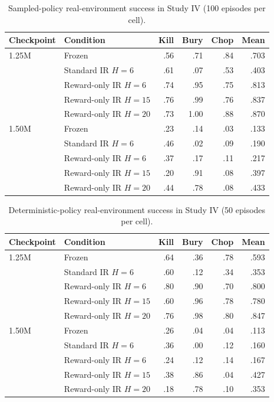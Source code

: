 \documentclass[10pt]{article}
\begin{document}
\begin{table}[H]
\centering
\small
\caption{Sampled-policy real-environment success in Study IV (100 episodes per cell).}
\begin{tabular}{llrrrr}
\toprule
Checkpoint & Condition & Kill & Bury & Chop & Mean \\
\midrule
1.25M & Frozen & .56 & .71 & .84 & .703 \\
      & Standard IR $H=6$ & .61 & .07 & .53 & .403 \\
      & Reward-only IR $H=6$ & .74 & .95 & .75 & .813 \\
      & Reward-only IR $H=15$ & .76 & .99 & .76 & .837 \\
      & Reward-only IR $H=20$ & .73 & 1.00 & .88 & .870 \\
\midrule
1.50M & Frozen & .23 & .14 & .03 & .133 \\
      & Standard IR $H=6$ & .46 & .02 & .09 & .190 \\
      & Reward-only IR $H=6$ & .37 & .17 & .11 & .217 \\
      & Reward-only IR $H=15$ & .20 & .91 & .08 & .397 \\
      & Reward-only IR $H=20$ & .44 & .78 & .08 & .433 \\
\bottomrule
\end{tabular}
\end{table}

\begin{table}[H]
\centering
\small
\caption{Deterministic-policy real-environment success in Study IV (50 episodes per cell).}
\begin{tabular}{llrrrr}
\toprule
Checkpoint & Condition & Kill & Bury & Chop & Mean \\
\midrule
1.25M & Frozen & .64 & .36 & .78 & .593 \\
      & Standard IR $H=6$ & .60 & .12 & .34 & .353 \\
      & Reward-only IR $H=6$ & .80 & .90 & .70 & .800 \\
      & Reward-only IR $H=15$ & .60 & .96 & .78 & .780 \\
      & Reward-only IR $H=20$ & .76 & .98 & .80 & .847 \\
\midrule
1.50M & Frozen & .26 & .04 & .04 & .113 \\
      & Standard IR $H=6$ & .36 & .00 & .12 & .160 \\
      & Reward-only IR $H=6$ & .24 & .12 & .14 & .167 \\
      & Reward-only IR $H=15$ & .38 & .86 & .04 & .427 \\
      & Reward-only IR $H=20$ & .18 & .78 & .10 & .353 \\
\bottomrule
\end{tabular}
\end{table}
\end{document}
